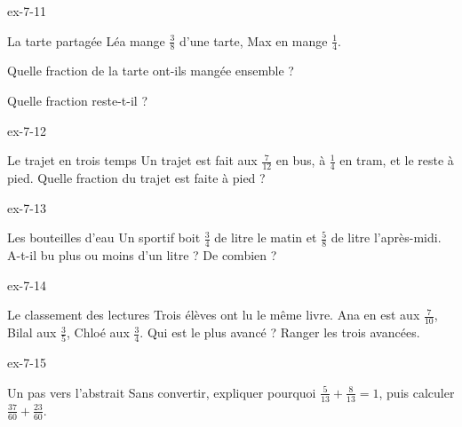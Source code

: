 \begin{blocLivre}{ex-7-11}\begin{exercice}[3]{La tarte partagée}
Léa mange $\frac38$ d’une tarte, Max en mange $\frac14$.\begin{questions}
\item Quelle fraction de la tarte ont-ils mangée ensemble ?
\item Quelle fraction reste-t-il ?
\end{questions}
\end{exercice}\end{blocLivre}
\begin{blocLivre}{ex-7-12}\begin{exercice}[3]{Le trajet en trois temps}
Un trajet est fait aux $\frac7{12}$ en bus, à $\frac14$ en tram, et le reste à pied. Quelle fraction du trajet est faite à pied ?
\end{exercice}\end{blocLivre}
\begin{blocLivre}{ex-7-13}\begin{exercice}[3]{Les bouteilles d’eau}
Un sportif boit $\frac34$ de litre le matin et $\frac58$ de litre l’après-midi. A-t-il bu plus ou moins d’un litre ? De combien ?
\end{exercice}\end{blocLivre}
\begin{blocLivre}{ex-7-14}\begin{exercice}[3]{Le classement des lectures}
Trois élèves ont lu le même livre. Ana en est aux $\frac7{10}$, Bilal aux $\frac35$, Chloé aux $\frac34$. Qui est le plus avancé ? Ranger les trois avancées.
\end{exercice}\end{blocLivre}
\begin{blocLivre}{ex-7-15}\begin{exercice}[3]{Un pas vers l’abstrait}
Sans convertir, expliquer pourquoi $\frac5{13}+\frac8{13}=1$, puis calculer $\frac{37}{60}+\frac{23}{60}$.
\end{exercice}\end{blocLivre}

\clearpage
